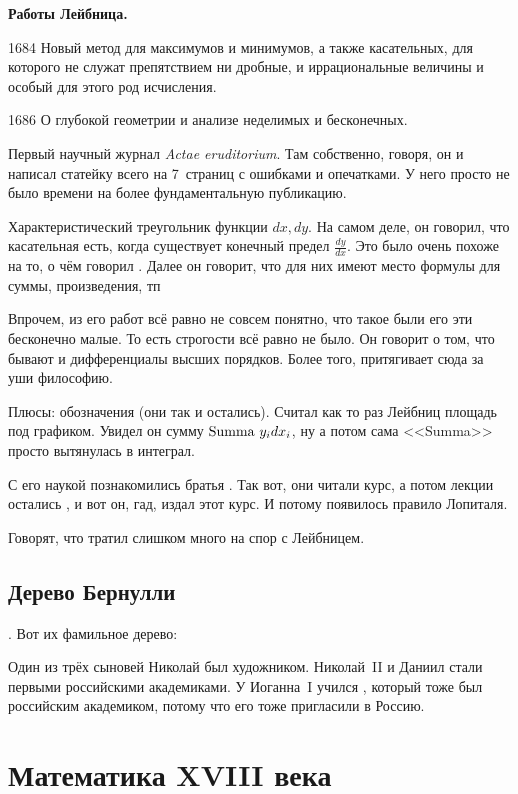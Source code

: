 \documentclass[a4paper,oneside,fleqn,10pt]{article}
\begin{document}
\textbf{Работы Лейбница.}

1684 Новый метод для максимумов и минимумов, а также касательных, для
которого не служат препятствием ни дробные, и иррациональные величины
и особый для этого род исчисления.

1686 О глубокой геометрии и анализе неделимых и бесконечных.

Первый научный журнал \emph{Actae eruditorium}. Там собственно,
говоря, он и написал статейку всего на 7~страниц с ошибками и
опечатками.  У него просто не было времени на более фундаментальную
публикацию.

Характеристический треугольник функции $dx,dy$. На самом деле, он
говорил, что касательная есть, когда существует конечный предел
$\frac{dy}{dx}$.  Это было очень похоже на то, о чём говорил
. Далее он говорит, что для них имеют место формулы для
суммы, произведения, тп

Впрочем, из его работ всё равно не совсем понятно, что такое были его
эти бесконечно малые.  То есть строгости всё равно не было. Он говорит
о том, что бывают и дифференциалы высших порядков.  Более того,
притягивает сюда за уши философию.

Плюсы: обозначения (они так и остались). Считал как то раз Лейбниц
площадь под графиком.  Увидел он сумму $\hbox{Summa }y_i dx_i$, ну а
потом сама <<Summa>> просто вытянулась в интеграл.

С его наукой познакомились братья . Так вот, они читали
курс, а потом лекции остались , и вот он,
гад, издал этот курс.  И потому появилось правило Лопиталя.

Говорят, что  тратил слишком много на спор с Лейбницем.

\subsection{Дерево Бернулли}

. Вот их фамильное дерево:


Один из трёх сыновей Николай был художником.  Николай~II и Даниил
стали первыми российскими академиками.  У Иоганна~I учился
, который тоже был российским академиком, потому что его
тоже пригласили в Россию.


\section{Математика XVIII века}
\end{document}

